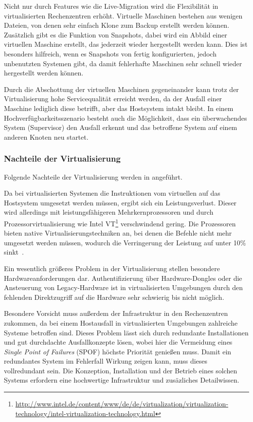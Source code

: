 Nicht nur durch Features wie die Live-Migration wird die Flexibilität in virtualisierten Rechenzentren erhöht.
Virtuelle Maschinen bestehen aus wenigen Dateien, von denen sehr einfach Klone zum Backup erstellt werden können.
Zusätzlich gibt es die Funktion von Snapshots, dabei wird ein Abbild einer virtuellen Maschine erstellt, das jederzeit wieder hergestellt werden kann.
Dies ist besonders hilfreich, wenn es Snapshots von fertig konfigurierten, jedoch unbenutzten Systemen gibt, da damit fehlerhafte Maschinen sehr schnell wieder hergestellt werden können.

Durch die Abschottung der virtuellen Maschinen gegeneinander kann trotz der Virtualisierung hohe Servicequalität erreicht werden, da der Ausfall einer Maschine lediglich diese betrifft, aber das Hostsystem intakt bleibt.
In einem Hochverfügbarkeitsszenario besteht auch die Möglichkeit, dass ein überwachendes System (Supervisor) den Ausfall erkennt und das betroffene System auf einem anderen Knoten neu startet.

\subsubsection{Nachteile der Virtualisierung}
Folgende Nachteile der Virtualisierung werden in \autocite{Baun2009} angeführt.

Da bei virtualisierten Systemen die Instruktionen vom virtuellen auf das Hostsystem umgesetzt werden müssen, ergibt sich ein Leistungsverlust.
Dieser wird allerdings mit leistungsfähigeren Mehrkernprozessoren und durch Prozessorvirtualisierung wie Intel VT\footnote{\url{http://www.intel.de/content/www/de/de/virtualization/virtualization-technology/intel-virtualization-technology.html}} verschwindend gering.
Die Prozessoren bieten native Virtualisierungstechniken an, bei denen die Befehle nicht mehr umgesetzt werden müssen, wodurch die Verringerung der Leistung auf unter 10\% sinkt~\autocite{Hardt2005}.

Ein wesentlich größeres Problem in der Virtualisierung stellen besondere Hardwareanforderungen dar.
Authentifizierung über Hardware-Dongles oder die Ansteuerung von Legacy-Hardware ist in virtualisierten Umgebungen durch den fehlenden Direktzugriff auf die Hardware sehr schwierig bis nicht möglich.

Besondere Vorsicht muss außerdem der Infrastruktur in den Rechenzentren zukommen, da bei einem Hostausfall in virtualisierten Umgebungen zahlreiche Systeme betroffen sind.
Dieses Problem lässt sich durch redundante Installationen und gut durchdachte Ausfallkonzepte lösen, wobei hier die Vermeidung eines \emph{Single Point of Failures} (SPOF) höchste Priorität genießen muss.
Damit ein redundantes System im Fehlerfall Wirkung zeigen kann, muss dieses vollredundant sein.
Die Konzeption, Installation und der Betrieb eines solchen Systems erfordern eine hochwertige Infrastruktur und zusäzliches Detailwissen.


